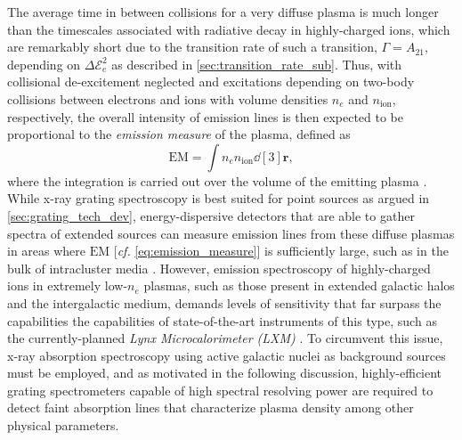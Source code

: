 The average time in between collisions for a very diffuse plasma is much longer than the timescales associated with radiative decay in highly-charged ions, which are remarkably short due to the transition rate of such a transition, $\Gamma = A_{21}$, depending on $\Delta \mathcal{E}_e^2$ as described in \cref{sec:transition_rate_sub}. 
Thus, with collisional de-excitement neglected and excitations depending on two-body collisions between electrons and ions with volume densities $n_e$ and $n_{\text{ion}}$, respectively, the overall intensity of emission lines is then expected to be proportional to the \emph{emission measure} of the plasma, defined as 
\begin{equation}\label{eq:emission_measure}
 \text{EM} = \int n_e n_{\text{ion}} \dd[3]{\mathbold{r}} ,
 \end{equation}
where the integration is carried out over the volume of the emitting plasma \cite{Paerels03}. 
While x-ray grating spectroscopy is best suited for point sources as argued in \cref{sec:grating_tech_dev}, energy-dispersive detectors that are able to gather spectra of extended sources can measure emission lines from these diffuse plasmas in areas where $\text{EM}$ [\emph{cf.\@} \cref{eq:emission_measure}] is sufficiently large, such as in the bulk of intracluster media \cite{Bohringer10}. 
However, emission spectroscopy of highly-charged ions in extremely low-$n_e$ plasmas, such as those present in extended galactic halos and the intergalactic medium, demands levels of sensitivity that far surpass the capabilities the capabilities of state-of-the-art instruments of this type, such as the currently-planned \emph{Lynx Microcalorimeter (LXM)} \cite{Bandler19}. %
To circumvent this issue, x-ray absorption spectroscopy using active galactic nuclei as background sources must be employed, and as motivated in the following discussion, highly-efficient grating spectrometers capable of high spectral resolving power are required to detect faint absorption lines that characterize plasma density among other physical parameters. 

